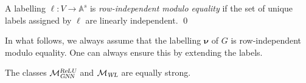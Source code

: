 \begin{definition}\label{def:label2}\normalfont
	A labelling $\pmb{\ell}:V\to\mathbb{A}^s$ is \textit{row-independent modulo equality} if the set of unique labels assigned by $\pmb{\ell}$ are linearly independent. \qed
\end{definition}
In what follows, we always assume that the labelling $\pmb{\nu}$ of $G$ is row-independent modulo equality. One can always ensure this by extending the labels. 
%
\begin{proposition}
The classes $\mathcal{M}_{\textsl{GNN}}^{\textsl{ReLU}}$ and  $\mathcal{M}_{\textsl{WL}}$ are equally strong.
\end{proposition}
